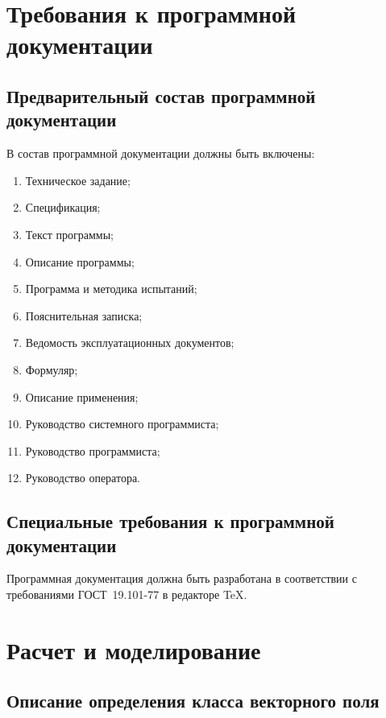 \documentclass[14pt,a4paper,final]{extreport}
\begin{document}
\chapter{Требования к программной документации}

\section{Предварительный состав программной документации}
В состав программной документации должны быть включены:
\begin{enumerate}[label=\arabic*.,ref=\arabic*]
	\item Техническое задание;
	\item Спецификация;
	\item Текст программы;
	\item Описание программы;
	\item Программа и методика испытаний;
	\item Пояснительная записка;
	\item Ведомость эксплуатационных документов;
	\item Формуляр;
	\item Описание применения;
	\item Руководство системного программиста;
	\item Руководство программиста;
	\item Руководство оператора.
\end{enumerate}

\fancyhead[C]{\bfseries\thepage\\\docstamp}  %

\section{Специальные требования к программной документации}
Программная документация должна быть разработана в соответствии с требованиями ГОСТ~19.101-77 в редакторе TeX.

\pagebreak %



\chapter{Расчет и моделирование}
\section{Описание определения класса векторного поля}
\end{document}
